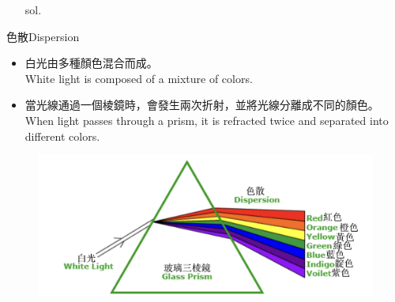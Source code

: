 \documentclass[beamer=true]{standalone}
\begin{document}
\begin{eg}
    \begin{itemize}
        \item [sol.]
    \end{itemize}
\end{eg}


\begin{frame}{色散Dispersion}
    \begin{itemize}
        \item 白光由多種顏色混合而成。\\White light is composed of a mixture of colors.
        \item 當光線通過一個棱鏡時，會發生兩次折射，並將光線分離成不同的顏色。\\When light passes through a prism, it is refracted twice and separated into different colors.
    \end{itemize}
    \begin{figure}
        \centering
        \includegraphics[width=0.75\linewidth]{assets/qdwdqdwq1111e.png}
    \end{figure}
\end{frame}
\end{document}
